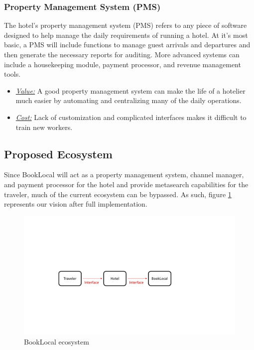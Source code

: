 \documentclass{article}
\begin{document}
\subsubsection{Property Management System (PMS)}
The hotel's property management system (PMS) refers to any piece of software designed to help manage the daily requirements of running a hotel. At it's most basic, a PMS will include functions to manage guest arrivals and departures and then generate the necessary reports for auditing. More advanced systems can include a housekeeping module, payment processor, and revenue management tools. 
\begin{itemize}
 \item \underline{\textit{Value:}} A good property management system can make the life of a hotelier much easier by automating and centralizing many of the daily operations. 
  \item \underline{\textit{Cost:}} Lack of customization and complicated interfaces makes it difficult to train new workers. 
  \end{itemize}

\newpage

\subsection{Proposed Ecosystem}
Since BookLocal will act as a property management system, channel manager, and payment processor for the hotel and provide metasearch capabilities for the traveler, much of the current ecosystem can be bypassed. As such, figure \ref{bl} represents our vision after full implementation. 

\begin{figure}[H]
\centering
\includegraphics[width = .9\textwidth]{bookLocal_ecosystem3.pdf}
\caption{BookLocal ecosystem}
\label{bl}
\end{figure}
\end{document}
